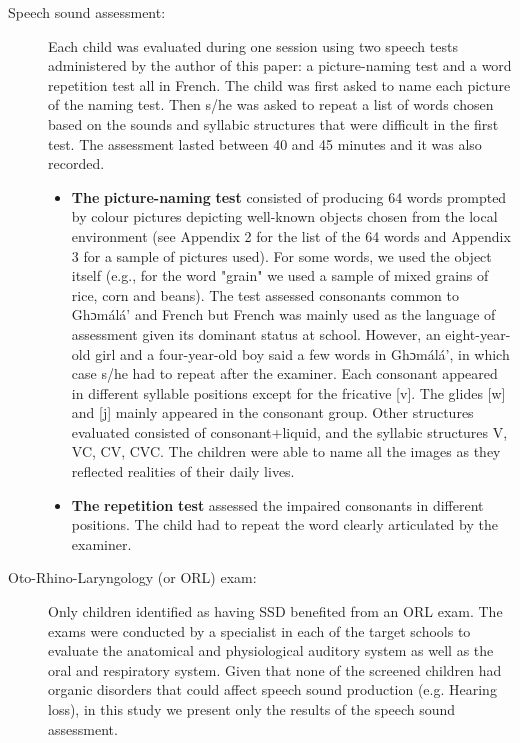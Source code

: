\documentclass[output=paper,newtxmath,modfonts,nonflat,draftmode]{langsci/langscibook}
\begin{document}
\begin{description}
\item[Speech sound assessment:] {\sloppy Each child was evaluated during one session using two speech tests administered by the author of this paper: a picture-\linebreak naming test and a word repetition test all in French. The child was first asked to name each picture of the naming test. Then s/he was asked to repeat a list of words chosen based on the sounds and syllabic structures that were difficult in the first test. The assessment lasted between 40 and 45 minutes and it was also recorded.}

\begin{itemize}
\item  \textbf{The} \textbf{picture-naming} \textbf{test} consisted of producing 64 words prompted by colour pictures depicting well-known objects chosen from the local environment (see Appendix 2 for the list of the 64 words and Appendix 3 for a sample of pictures used). For some words, we used the object itself (e.g., for the word "grain" we used a sample of mixed grains of rice, corn and beans). The test assessed consonants common to Ghɔmálá’ and French but French was mainly used as the language of assessment given its dominant status at school. However, an eight-year-old girl and a four-year-old boy said a few words in Ghɔmálá’, in which case s/he had to repeat after the examiner. Each consonant appeared in different syllable positions except for the fricative [v]. The glides [w] and [j] mainly appeared in the consonant group. Other structures evaluated consisted of consonant+liquid, and the syllabic structures V, VC, CV, CVC. The children were able to name all the images as they reflected realities of their daily lives.
\item  \textbf{The} \textbf{repetition} \textbf{test} assessed the impaired consonants in different positions. The child had to repeat the word clearly articulated by the examiner.
\end{itemize}

\item[Oto-Rhino-Laryngology (or ORL) exam:] Only children identified as having SSD benefited from an ORL exam. The exams were conducted by a specialist in each of the target schools to evaluate the anatomical and physiological auditory system as well as the oral and respiratory system. Given that none of the screened children had organic disorders that could affect speech sound production (e.g. Hearing loss), in this study we present only the results of the speech sound assessment.
\end{description}
\end{document}
